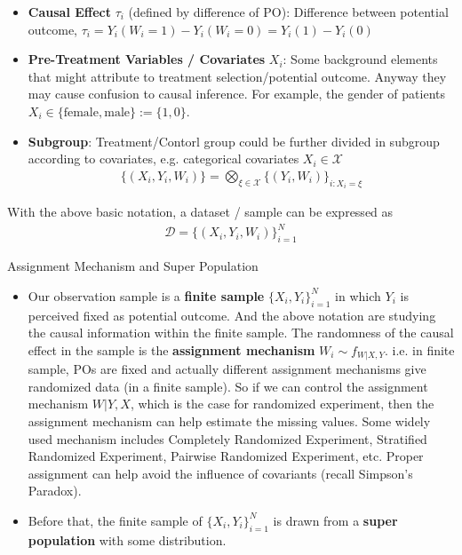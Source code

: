 \begin{itemize}[topsep=2pt,itemsep=0pt]
        
        \item \textbf{Causal Effect} $ \tau_i $ (defined by difference of PO): Difference between potential outcome, $ \tau_i=Y_i(W_i=1)-Y_i(W_i=0)=Y_i(1)-Y_i(0) $
        \item \textbf{Pre-Treatment Variables / Covariates} $ X_i $: Some background elements that might attribute to treatment selection/potential outcome. Anyway they may cause confusion to causal inference. For example, the gender of patients $ X_i\in\{\mathrm{female}, \mathrm{male}  \}:=\{1,0\} $.
        \item \textbf{Subgroup}: Treatment/Contorl group could be further divided in subgroup according to covariates, e.g. categorical covariates $ X_i\in\mathcal{X} $
        \begin{align}
            \{(X_i,Y_i,W_i)\}=\bigotimes_{\xi \in\mathcal{\mathcal{X}}}\{(Y_i,W_i)\}_{i:X_i=\xi }
        \end{align}
    \end{itemize}

    With the above basic notation, a dataset / sample can be expressed as
    \begin{align}
        \mathcal{D}=\{(X_i,Y_i,W_i)\}_{i=1}^N 
    \end{align}
    

\begin{point}
    Assignment Mechanism and Super Population
\end{point}

\begin{itemize}[topsep=2pt,itemsep=0pt]
    \item Our observation sample is a \textbf{finite sample} $\{X_i,Y_i\}_{i=1}^N $ in which $ Y_i $ is perceived fixed as potential outcome. And the above notation are studying the causal information within the finite sample. The randomness of the causal effect in the sample is the \textbf{assignment mechanism} $ W_i\sim f_{W|X,Y} $. i.e. in finite sample, POs are fixed and actually different assignment mechanisms give randomized data (in a finite sample). So if we can control the assignment mechanism $ W|Y,X $, which is the case for randomized experiment, then the assignment mechanism can help estimate the missing values.   
    Some widely used mechanism includes Completely Randomized Experiment, Stratified Randomized Experiment, Pairwise Randomized Experiment, etc. Proper assignment can help avoid the influence of covariants (recall Simpson's Paradox).
    \item Before that, the finite sample of $ \{X_i,Y_i\}_{i=1}^N $ is drawn from a \textbf{super population} with some distribution.
\end{itemize}


